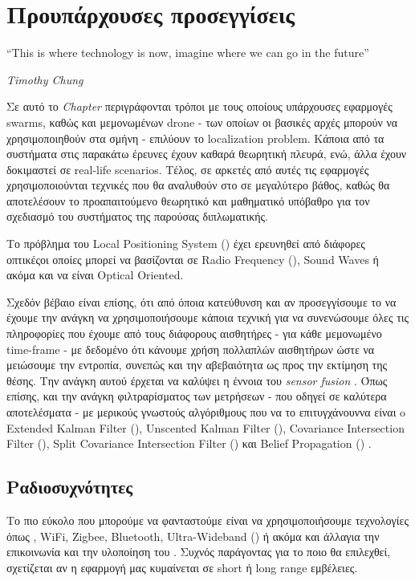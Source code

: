 \chapter{Προυπάρχουσες προσεγγίσεις} \label{chap:Chapter2}       
\epigraph{``This is where technology is now, imagine where we can go in the future” }{\textit{Timothy Chung}}

Σε αυτό το \emph{Chapter} περιγράφονται τρόποι με τους οποί\-ους υπάρχουσες εφαρμογές  swarms, καθώς και 
μεμονωμένων drone - των οποίων οι βασικές αρχές μπορούν να χρησιμοποιηθούν στα σμήνη - επιλύουν το localization pro\-blem. Κάποια από τα συστήματα στις 
παρακάτω έρευνες έχουν καθαρά θεωρητική πλευρά, ενώ, άλλα έχουν δοκιμαστεί σε real-life scenarios.
Τέλος, σε α\-ρκε\-τές από αυτές τις εφαρμογές χρησιμοποιούνται τεχνικές που θα αναλυθούν στο 
σε μεγαλύτερο βάθος, καθώς θα αποτελέσουν το προαπαιτούμενο θεωρητικό και μαθηματικό υπόβαθρο για τον σχεδιασμό 
του συστήματος της παρούσας διπλωματικής.

Το πρόβλημα του Local Positioning System () \cite{lps} έχει ερευνηθεί από διάφορες οπτικές\udot οι 
οποίες μπορεί να βασίζονται σε Radio Frequency (), Sound Waves ή ακόμα και να είναι Optical Oriented.

Σχεδόν βέβαιο είναι επίσης, ότι από όποια κατεύθυνση και αν προσεγγίσουμε το  να έχουμε την ανάγκη να 
χρησιμοποιήσουμε κάποια τεχνική για να συνενώσουμε όλες τις πληροφορίες που έχουμε από τους διάφορους αισθητήρες -
για κάθε μεμονωμένο time-frame - με δεδομένο ότι κάνουμε χρήση πολλαπλών αισθητήρων ώστε να μειώσουμε την εντροπία, 
συνεπώς και την αβεβαιότητα ως προς την εκτίμηση της θέσης. 
Την ανάγκη αυτού έρχεται να καλύψει η έννοια του \emph{sensor fusion} \cite{sensor-fusion}. Όπως επίσης, και την 
ανάγκη φιλτραρίσματος των μετρήσεων - που οδηγεί σε καλύτερα αποτε\-λέ\-σμα\-τα - με μερικούς γνωστούς αλγόριθμους 
που να το επιτυγχάνουν\udot να είναι o Extended Kalman Filter (), Unscented Kalman Filter (), 
Covariance Intersection Filter (),  Split  Covariance  Intersection  Filter () και  Belief  
Propagation () \cite{fusion-filters}. 

\section{Ραδιοσυχνότητες}
Το πιο εύκολο που μπορούμε να φανταστούμε είναι να χρησιμοποιήσουμε  τε\-χνο\-λο\-γίες όπως , WiFi, Zigbee, Bluetooth, Ultra-Wideband () ή ακόμα και άλλα\udot για την επικοινωνία και την υλοποίηση του . Συχνός παράγοντας για το ποιο θα επιλεχθεί, σχετίζεται αν η εφαρμογή μας κυμαίνεται σε short ή long range εμβέλειες.

